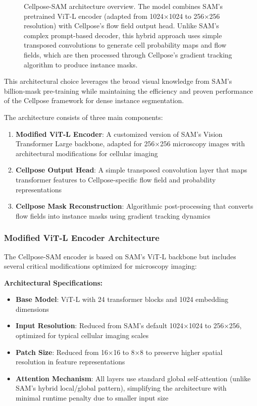 \documentclass[../cellseek_paper.tex]{subfiles}
\begin{document}
\begin{figure}[H]
  \centering
  
  \caption{Cellpose-SAM architecture overview. The model combines SAM's pretrained ViT-L encoder (adapted from 1024×1024 to 256×256 resolution) with Cellpose's flow field output head. Unlike SAM's complex prompt-based decoder, this hybrid approach uses simple transposed convolutions to generate cell probability maps and flow fields, which are then processed through Cellpose's gradient tracking algorithm to produce instance masks.}
  \label{fig:cellpose_sam_arch}
\end{figure}

This architectural choice leverages the broad visual knowledge from SAM's billion-mask pre-training while maintaining the efficiency and proven performance of the Cellpose framework for dense instance segmentation.

The architecture consists of three main components:

\begin{enumerate}
  \item \textbf{Modified ViT-L Encoder}: A customized version of SAM's Vision Transformer Large backbone, adapted for 256×256 microscopy images with architectural modifications for cellular imaging
  \item \textbf{Cellpose Output Head}: A simple transposed convolution layer that maps transformer features to Cellpose-specific flow field and probability representations
  \item \textbf{Cellpose Mask Reconstruction}: Algorithmic post-processing that converts flow fields into instance masks using gradient tracking dynamics
\end{enumerate}

\subsubsection{Modified ViT-L Encoder Architecture}

The Cellpose-SAM encoder is based on SAM's ViT-L backbone but includes several critical modifications optimized for microscopy imaging:

\textbf{Architectural Specifications:}
\begin{itemize}
  \item \textbf{Base Model}: ViT-L with 24 transformer blocks and 1024 embedding dimensions
  \item \textbf{Input Resolution}: Reduced from SAM's default 1024×1024 to 256×256, optimized for typical cellular imaging scales
  \item \textbf{Patch Size}: Reduced from 16×16 to 8×8 to preserve higher spatial resolution in feature representations
  \item \textbf{Attention Mechanism}: All layers use standard global self-attention (unlike SAM's hybrid local/global pattern), simplifying the architecture with minimal runtime penalty due to smaller input size
\end{itemize}
\end{document}

